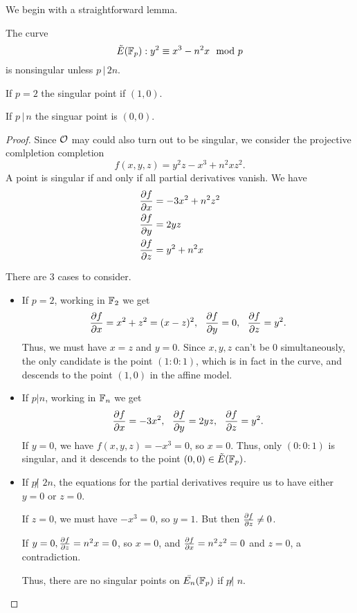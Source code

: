 \documentclass[12pt, a4paper]{amsart}
\begin{document}
We begin with a straightforward lemma.

\begin{lemma} \label{singularity_condition}
  The curve
  \[ {\tilde{E}(\mathbb{F}_p)} : y^2 \equiv x^3 - n^2x \mod{p}\]
  is nonsingular unless $p \, | \, 2n$.

  If $p = 2$ the singular point if $(1,0)$.

  If $p \, | \, n$ the singuar point is $(0,0)$.

\end{lemma}

\begin{proof}
  Since ${\mathcal O}$ may could also turn out to be singular, we consider
  the projective comlpletion completion
  \[f(x,y,z) = y^2z - x^3 + n^2 xz^2.\]
  A point is singular if and only if all partial derivatives vanish.
  We have
  \begin{equation*}
    \begin{split}
      \frac{\partial f}{\partial x} &= -3x^2 + n^2z^2 \\
      \frac{\partial f}{\partial y} &= 2yz \\
      \frac{\partial f}{\partial z} &= y^2 + n^2x
    \end{split}
  \end{equation*}
 
  There are 3 cases to consider.
  
  \begin{itemize}
  \item If $p = 2$, working in $\mathbb{F}_2$ we get
    \[\frac{\partial f}{\partial x} = x^2+z^2 = (x-z)^2, \,\,\,\,
      \frac{\partial f}{\partial y} = 0, \,\,\,\,
      \frac{\partial f}{\partial z} = y^2.\]
    Thus, we must have $x = z$ and $ y = 0$. Since $x, y, z$ can't be 0
    simultaneously, the only candidate is the point $(1:0:1)$, which
    is in fact in the curve, and descends to the point $(1,0)$ in the
    affine model.
    
  \item If $p | n$, working in $\mathbb{F}_n$ we get
    \[  \frac{\partial f}{\partial x} = -3x^2, \,\,\,\,
        \frac{\partial f}{\partial y} = 2yz, \,\,\,\,
        \frac{\partial f}{\partial z} = y^2.
      \]
    If $y = 0$, we have $f(x,y,z) = -x^3 = 0$, so $x = 0$.
    Thus,  only $(0:0:1)$ is singular, and it descends to the point $(0,0) \in {\tilde{E}(\mathbb{F}_p)}$.

  \item If $p \not| \,\, 2n$, the equations for the partial derivatives
    require us to have either $y = 0$ or $z = 0$.
   
    If $z = 0$, we must have $-x^3 = 0$, so $y = 1$. But then $\frac{\partial f}{\partial z}
    \neq 0$.

    If $y = 0, \frac{\partial f}{\partial z} = n^2x = 0$, so $x = 0$, and $\frac{\partial f}{\partial x} =
    n^2z^2 = 0$ and $ z = 0$, a contradiction.

    Thus, there are no singular points on $\bar{E_n}(\mathbb{F}_p)$ if $p \not|
    \,\, n$. \qedhere
  \end{itemize}
\end{proof}
\end{document}
